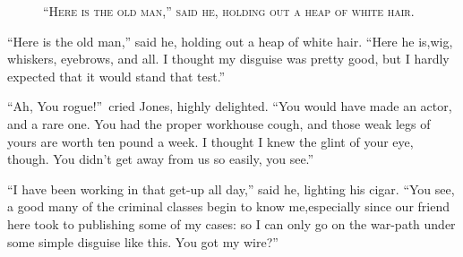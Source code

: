 \documentclass[12pt,english,oneside]{book}
\newcommand{\noun}[1]{\textsc{#1}}
\begin{document}
%
\begin{figure}[htbp]
\noindent {}

\noindent \begin{center}\noun{{}``Here is the old man,'' said
he, holding out a heap of white hair.}\end{center}
\end{figure}
{}``Here is the old man,'' said he, holding out a heap of white
hair. {}``Here he is,\mdsh{---}wig, whiskers, eyebrows, and all.
I thought my disguise was pretty good, but I hardly expected that
it would stand that test.''

{}``Ah, You rogue!''\ cried Jones, highly delighted. {}``You would
have made an actor, and a rare one. You had the proper workhouse cough,
and those weak legs of yours are worth ten pound a week. I thought
I knew the glint of your eye, though. You didn't get away from us
so easily, you see.''

{}``I have been working in that get-up all day,'' said he, lighting
his cigar. {}``You see, a good many of the criminal classes begin
to know me,\mdsh{---}especially since our friend here took to publishing
some of my cases: so I can only go on the war-path under some simple
disguise like this. You got my wire?''
\end{document}
